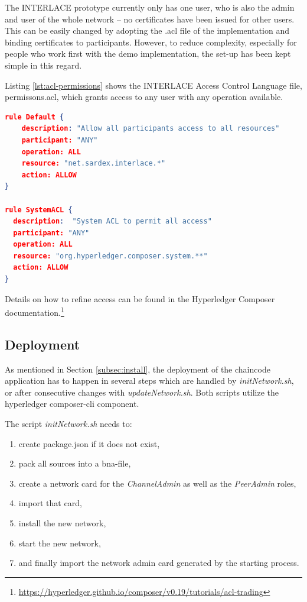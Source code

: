 The INTERLACE prototype currently only has one user, who is also the admin and user of the whole network -- no certificates have been issued for other users.  This can be easily changed by adopting the .acl file of the implementation and binding certificates to participants.  However, to reduce complexity, especially for people who work first with the demo implementation, the set-up has been kept simple in this regard.

Listing \ref{lst:acl-permissions} shows the INTERLACE Access Control Language file, permissons.acl, which grants access to any user with any operation available.

\begin{center}
\begin{minipage}{0.8\textwidth}
\small
\begin{lstlisting}[language=json,firstnumber=1,caption={\bf\small Access  control configuration for INTERLACE}, captionpos=b,label=lst:acl-permissions]
rule Default {
    description: "Allow all participants access to all resources"
    participant: "ANY"
    operation: ALL
    resource: "net.sardex.interlace.*"
    action: ALLOW
}

rule SystemACL {
  description:  "System ACL to permit all access"
  participant: "ANY"
  operation: ALL
  resource: "org.hyperledger.composer.system.**"
  action: ALLOW
}
\end{lstlisting}
\end{minipage}
\end{center}

Details on how to refine access can be found in the Hyperledger Composer documentation.\footnote{\url{https://hyperledger.github.io/composer/v0.19/tutorials/acl-trading}}

\subsection{Deployment}

As mentioned in Section \ref{subsec:install}, the deployment of the chaincode application has to happen in several steps which are handled by \textit{initNetwork.sh}, or after consecutive changes with \textit{updateNetwork.sh}. Both scripts utilize the hyperledger composer-cli component.

The script \textit{initNetwork.sh} needs to:

\begin{enumerate}
	\item create package.json if it does not exist,
	\item pack all sources into a bna-file,
	\item create a network card for the \textit{ChannelAdmin} as well as the \textit{PeerAdmin} roles,
	\item import that card,
	\item install the new network,
	\item start the new network,
	\item and finally import the network admin card generated by the starting process.
\end{enumerate}

